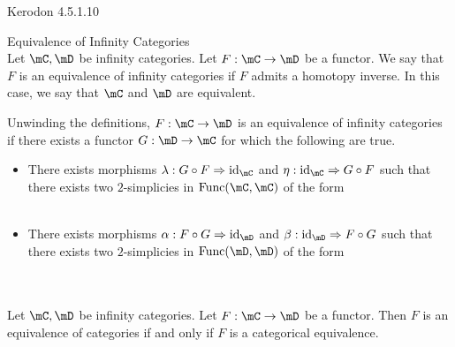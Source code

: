 \documentclass[a4paper]{article}
\begin{document}
Kerodon 4.5.1.10\\

\begin{defn}{Equivalence of Infinity Categories}{}\\ Let $\mC,\mD$ be infinity categories. Let $F:\mC\to\mD$ be a functor. We say that $F$ is an equivalence of infinity categories if $F$ admits a homotopy inverse. In this case, we say that $\mC$ and $\mD$ are equivalent. 
\end{defn}

Unwinding the definitions, $F:\mC\to\mD$ is an equivalence of infinity categories if there exists a functor $G:\mD\to\mC$ for which the following are true. 
\begin{itemize}
\item There exists morphisms $\lambda:G\circ F\Rightarrow\text{id}_\mC$ and $\eta:\text{id}_\mC\Rightarrow G\circ F$ such that there exists two $2$-simplicies in $\text{Func}(\mC,\mC)$ of the form \\
\\
\item There exists morphisms $\alpha:F\circ G\Rightarrow\text{id}_\mD$ and $\beta:\text{id}_\mD\Rightarrow F\circ G$ such that there exists two $2$-simplicies in $\text{Func}(\mD,\mD)$ of the form \\
\\
\end{itemize}

\begin{lmm}{}{}\\ Let $\mC,\mD$ be infinity categories. Let $F:\mC\to\mD$ be a functor. Then $F$ is an equivalence of categories if and only if $F$ is a categorical equivalence. 
\end{lmm}
\end{document}
